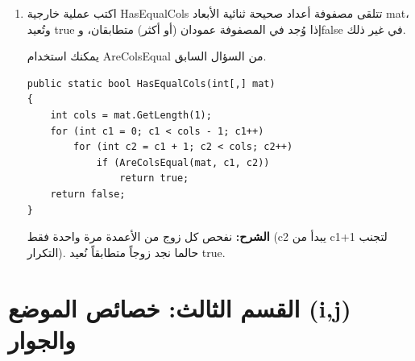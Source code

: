 \documentclass[14pt]{extarticle}
\begin{document}
\begin{enumerate}[itemsep=2em]
\ifwithsols
\begin{boxSolution}
\begin{boxCode}
\begin{english}
\begin{verbatim}
public static bool AreColsEqual(int[,] mat, int c1, int c2)
{
    for (int i = 0; i < mat.GetLength(0); i++)
        if (mat[i, c1] != mat[i, c2])
            return false;
    return true;
}
\end{verbatim}
\end{english}
\end{boxCode}
\textbf{الشرح:} نقارن عناصر العمودَين عنصراً عنصراً في نفس الصف. نمط "حالما نجد اختلافاً نُعيد \textenglish{false}" يُجنّبنا المرور الزائد.
\end{boxSolution}
\clearpage
\fi

\item
اكتب عملية خارجية \textenglish{HasEqualCols} تتلقى مصفوفة أعداد صحيحة ثنائية الأبعاد \textenglish{mat}، وتُعيد \textenglish{true} إذا وُجد في المصفوفة عمودان (أو أكثر) متطابقان، و\textenglish{false} في غير ذلك.

\begin{boxHint}
يمكنك استخدام \textenglish{AreColsEqual} من السؤال السابق.
\end{boxHint}

\ifwithsols
\begin{boxSolution}
\begin{boxCode}
\begin{english}
\begin{verbatim}
public static bool HasEqualCols(int[,] mat)
{
    int cols = mat.GetLength(1);
    for (int c1 = 0; c1 < cols - 1; c1++)
        for (int c2 = c1 + 1; c2 < cols; c2++)
            if (AreColsEqual(mat, c1, c2))
                return true;
    return false;
}
\end{verbatim}
\end{english}
\end{boxCode}
\textbf{الشرح:} نفحص كل زوج من الأعمدة مرة واحدة فقط (\textenglish{c2} يبدأ من \textenglish{c1+1} لتجنب التكرار). حالما نجد زوجاً متطابقاً نُعيد \textenglish{true}.
\end{boxSolution}
\fi

\end{enumerate}

\clearpage
\section*{القسم الثالث: خصائص الموضع (i,j) والجوار}
\end{document}
